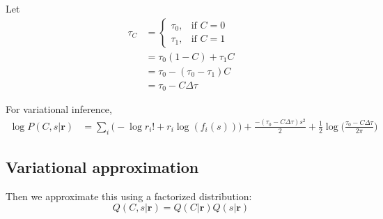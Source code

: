 \documentclass[12pt]{article}
\begin{document}
Let 
\begin{equation}
\begin{aligned}
\tau_C &= \begin{cases}
\tau_0, & \text{if } C = 0\\
\tau_1, & \text{if } C = 1
\end{cases}\\
&= \tau_0 (1 - C) + \tau_1 C\\
&= \tau_0 - (\tau_0 - \tau_1)C\\
&= \tau_0 - C \Delta \tau
\end{aligned}
\end{equation}

For variational inference,
\begin{equation}
\begin{aligned}
\log P(C, s|\mathbf{r}) &= \sum_i \Big(- \log r_i! + r_i \log(f_i(s)) \Big) + \frac{-(\tau_0 - C \Delta \tau) s^2}{2} + \frac{1}{2} \log \Big(\frac{\tau_0 - C \Delta \tau}{2 \pi} \Big)
\end{aligned}
\end{equation}

\subsection{Variational approximation}
Then we approximate this using a factorized distribution:
\begin{equation}
Q(C, s|\mathbf{r}) = Q(C|\mathbf{r}) Q(s|\mathbf{r})
\end{equation}
\end{document}
